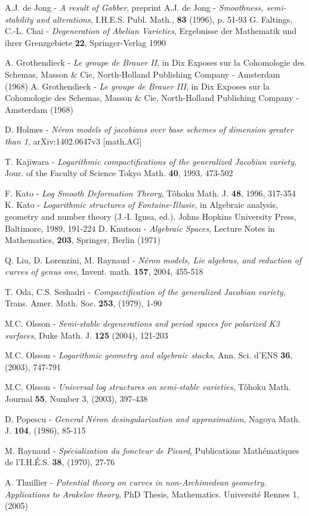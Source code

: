 \documentclass{amsart}
\theoremstyle{definition}
\numberwithin{equation}{section}
\begin{document}
\begin{thebibliography}{99}
 A.J. de Jong - \emph{A result of Gabber}, preprint
 A.J. de Jong - \emph{Smoothness, semi-stability and alterations}, I.H.E.S. Publ. Math., \textbf{83} (1996), p. 51-93
 G. Faltings, C.-L. Chai - \emph{Degeneration of Abelian Varieties},  Ergebnisse der Mathematik und ihrer Grenzgebiete \textbf{22}, Springer-Verlag 1990

 A. Grothendieck - \emph{Le groupe de Brauer II}, in Dix Exposes sur la Cohomologie des Schemas, Masson \& Cie, North-Holland Publishing Company - Amsterdam (1968)
 A. Grothendieck - \emph{Le groupe de Brauer III}, in Dix Exposes sur la Cohomologie des Schemas, Masson \& Cie, North-Holland Publishing Company - Amsterdam (1968)

 D. Holmes - \emph{N\'eron models of jacobians over base schemes of dimension greater than 1}, arXiv:1402.0647v3 [math.AG]

 T. Kajiwara - \emph{Logarithmic compactifications of the generalized Jacobian variety}, Jour. of the Faculty of Science Tokyo Math. \textbf{40}, 1993, 473-502 

 F. Kato - \emph{Log Smooth Deformation Theory}, T\^{o}hoku Math. J.  \textbf{48}, 1996, 317-354
 K. Kato - \emph{Logarithmic structures of Fontaine-Illusie}, in Algebraic analysis, geometry and number theory (J.-I. Igusa, ed.), Johns Hopkins University Press, Baltimore, 1989, 191-224
 D. Knutson - \emph{Algebraic Spaces}, Lecture Notes in Mathematics, \textbf{203}, Springer, Berlin (1971)

 Q. Liu, D. Lorenzini, M. Raynaud - \emph{N\'eron models, Lie algebras, and reduction of curves of genus one}, Invent. math. \textbf{157}, 2004, 455-518

 T. Oda, C.S. Seshadri - \emph{Compactification of the generalized Jacobian variety}, Trans. Amer. Math. Soc. \textbf{253}, (1979), 1-90

 M.C. Olsson - \emph{Semi-stable degenerations and period spaces for polarized K3 surfaces}, Duke Math. J. \textbf{125} (2004), 121-203

 M.C. Olsson - \emph{Logarithmic geometry and algebraic stacks}, Ann. Sci. d'ENS \textbf{36}, (2003), 747-791

 M.C. Olsson - \emph{Universal log structures on semi-stable varieties}, T\^{o}hoku Math. Journal \textbf{55}, Number 3, (2003), 397-438

 D. Popescu - \emph{General N\'eron desingularization and approximation}, Nagoya Math. J. \textbf{104}, (1986), 85-115

 M. Raynaud - \emph{Sp\'ecialization du foncteur de Picard}, Publications Math\'ematiques de l'I.H.\'E.S. \textbf{38}, (1970), 27-76

 A. Thuillier - \emph{Potential theory on curves in non-Archimedean geometry. Applications to Arakelov theory}, PhD Thesis, Mathematics. Universit\'e Rennes 1, (2005)
\end{thebibliography}
\end{document}
